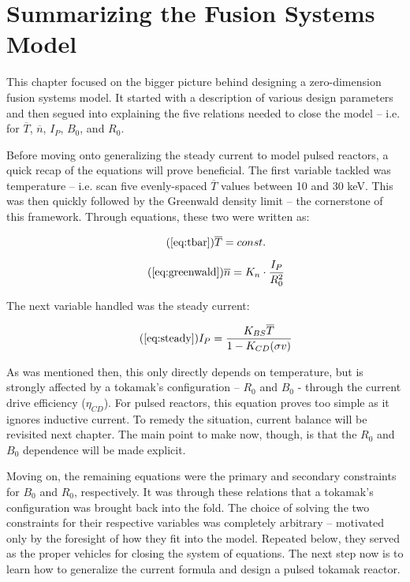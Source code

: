 \section{Summarizing the Fusion Systems Model}

This chapter focused on the bigger picture behind designing a zero-dimension fusion systems model. It started with a description of various design parameters and then segued into explaining the five relations needed to close the model -- i.e. for $\overline T$, $\overline n$, $I_P$, $B_0$, and $R_0$.

Before moving onto generalizing the steady current to model pulsed reactors, a quick recap of the equations will prove beneficial. The first variable tackled was temperature -- i.e. scan five evenly-spaced $\overline T$ values between 10 and 30 keV. This was then quickly followed by the Greenwald density limit -- the cornerstone of this framework. Through equations, these two were written as:

\begin{equation}
	\tag{\ref{eq:tbar}}
	\overline T = const.
\end{equation}

\begin{equation}
	\tag{\ref{eq:greenwald}}
	\overline n = K_n \cdot \frac{I_P}{R_0^2}
\end{equation}

The next variable handled was the steady current:

\begin{equation}
	\tag{\ref{eq:steady}}
	I_P = \frac{K_{BS} \overline T}{1 - K_{CD} ( \sigma v ) }
\end{equation}

As was mentioned then, this only directly depends on temperature, but is strongly affected by a tokamak's configuration -- $R_0$ and $B_0$ - through the current drive efficiency ($\eta_{CD}$). For pulsed reactors, this equation proves too simple as it ignores inductive current. To remedy the situation, current balance will be revisited next chapter. The main point to make now, though, is that the $R_0$ and $B_0$ dependence will be made explicit.

Moving on, the remaining equations were the primary and secondary constraints for $B_0$ and $R_0$, respectively. It was through these relations that a tokamak's configuration was brought back into the fold. The choice of solving the two constraints for their respective variables was completely arbitrary -- motivated only by the foresight of how they fit into the model. Repeated below, they served as the proper vehicles for closing the system of equations. The next step now is to learn how to generalize the current formula and design a pulsed tokamak reactor.

